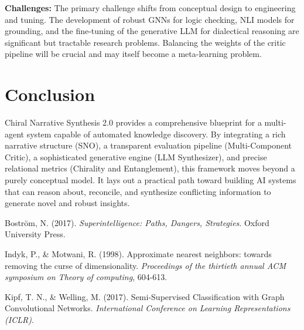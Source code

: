 \documentclass[12pt, a4paper]{article}
\begin{document}
\textbf{Challenges:} The primary challenge shifts from conceptual design to engineering and tuning. The development of robust GNNs for logic checking, NLI models for grounding, and the fine-tuning of the generative LLM for dialectical reasoning are significant but tractable research problems. Balancing the weights of the critic pipeline will be crucial and may itself become a meta-learning problem.

\section{Conclusion}
Chiral Narrative Synthesis 2.0 provides a comprehensive blueprint for a multi-agent system capable of automated knowledge discovery. By integrating a rich narrative structure (SNO), a transparent evaluation pipeline (Multi-Component Critic), a sophisticated generative engine (LLM Synthesizer), and precise relational metrics (Chirality and Entanglement), this framework moves beyond a purely conceptual model. It lays out a practical path toward building AI systems that can reason about, reconcile, and synthesize conflicting information to generate novel and robust insights.


\begin{thebibliography}{1}

Boström, N. (2017).
\textit{Superintelligence: Paths, Dangers, Strategies}.
Oxford University Press.

Indyk, P., \& Motwani, R. (1998).
Approximate nearest neighbors: towards removing the curse of dimensionality.
\textit{Proceedings of the thirtieth annual ACM symposium on Theory of computing}, 604-613.

Kipf, T. N., \& Welling, M. (2017).
Semi-Supervised Classification with Graph Convolutional Networks.
\textit{International Conference on Learning Representations (ICLR)}.

\end{thebibliography}
\end{document}
